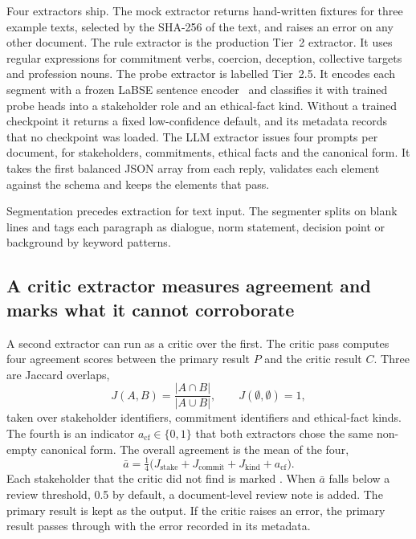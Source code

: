 Four extractors ship. The mock extractor returns hand-written fixtures for three example texts,
selected by the SHA-256 of the text, and raises an error on any other document. The rule extractor
is the production Tier~2 extractor. It uses regular expressions for commitment verbs, coercion,
deception, collective targets and profession nouns. The probe extractor is labelled Tier~2.5. It
encodes each segment with a frozen LaBSE sentence encoder~\cite{feng2022labse} and classifies it
with trained probe heads into a stakeholder role and an ethical-fact kind. Without a trained
checkpoint it returns a fixed low-confidence default, and its metadata records that no checkpoint
was loaded. The LLM extractor issues four prompts per document, for stakeholders, commitments,
ethical facts and the canonical form. It takes the first balanced JSON array from each reply,
validates each element against the schema and keeps the elements that pass.

Segmentation precedes extraction for text input. The segmenter splits on blank lines and tags
each paragraph as dialogue, norm statement, decision point or background by keyword patterns.

\subsection{A critic extractor measures agreement and marks what it cannot corroborate}

A second extractor can run as a critic over the first. The critic pass computes four agreement
scores between the primary result $P$ and the critic result $C$. Three are Jaccard overlaps,
\begin{equation}
J(A,B) = \frac{|A \cap B|}{|A \cup B|}, \qquad J(\emptyset,\emptyset) = 1,
\label{eq:compiler-jaccard}
\end{equation}
taken over stakeholder identifiers, commitment identifiers and ethical-fact kinds. The fourth is
an indicator $a_{\mathrm{cf}} \in \{0,1\}$ that both extractors chose the same non-empty
canonical form. The overall agreement is the mean of the four,
\begin{equation}
\bar{a} = \tfrac{1}{4}\bigl(J_{\mathrm{stake}} + J_{\mathrm{commit}} + J_{\mathrm{kind}} + a_{\mathrm{cf}}\bigr).
\label{eq:compiler-agreement}
\end{equation}
Each stakeholder that the critic did not find is marked . When $\bar{a}$
falls below a review threshold, 0.5 by default, a document-level review note is added. The primary
result is kept as the output. If the critic raises an error, the primary result passes through
with the error recorded in its metadata.

